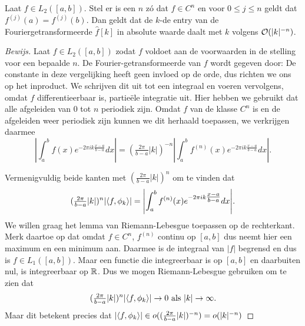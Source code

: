 \begin{stelling}
\label{fourier_daling}
  Laat $f \in L_2([a,b])$. Stel er is een $n$ z\'o dat $f \in C^n$ en voor $0\leq j\leq n$ geldt dat $f^{(j)}(a) = f^{(j)}(b)$. Dan geldt dat de $k$-de entry van de Fouriergetransformeerde $\hat f[k]$ in absolute waarde
  daalt met $k$ volgens $\mathcal{O}(|k|^{-n})$.
\end{stelling}
\begin{proof}[Bewijs]
  Laat $f \in L_2([a,b])$ zodat $f$ voldoet aan de voorwaarden in de stelling voor een bepaalde $n$. 
  De Fourier-getransformeerde van $f$ wordt gegeven door:
  De constante in deze vergelijking heeft geen invloed op de orde, dus richten we ons op het inproduct. 
  We schrijven dit uit tot een integraal en voeren vervolgens, omdat $f$ differentieerbaar is, partie\"ele
  integratie uit.
  Hier hebben we gebruikt dat alle afgeleiden van $0$ tot $n$ periodiek zijn.
  Omdat $f$ van de klasse $C^n$ is en de afgeleiden weer periodiek zijn kunnen we dit herhaald toepassen,
  we verkrijgen daarmee
  \[
  \left| \int_a^b f(x) e^{-2 \pi i k \tfrac{x-a}{b-a}} dx \right| 
  = (\tfrac{2 \pi}{b-a} |k|)^{-n}\left| \int_a^b f^{(n)}(x) e^{- 2 \pi i k \tfrac{x-a}{b-a}} dx \right|.
  \]
  
  Vermenigvuldig beide kanten met $(\tfrac{2 \pi}{b-a} |k|)^n$ om te vinden dat
  \[
  (\tfrac{2 \pi}{b-a} |k|)^n {\left| \langle f , \phi_k \rangle \right|} 
  = {\left| \int_a^b f^{(n)}(x) e^{- 2 \pi i k \tfrac{x-a}{b-a}} dx \right|}.
  \]
  We willen graag het lemma van Riemann-Lebesgue toepassen op de rechterkant. 
  Merk daartoe op dat omdat $f \in C^n$, $f^{(n)}$ continu op $[a,b]$ 
  dus neemt hier een maximum en een minimum aan. 
  Daarmee is de integraal van $|f|$ begrensd en dus is $f\in L_1([a,b])$. 
  Maar een functie die integreerbaar is op $[a,b]$ en daarbuiten nul, is integreerbaar op $\mathbb{R}$. 
  Dus we mogen Riemann-Lebesgue gebruiken om te zien dat
  \[
  (\tfrac{2 \pi}{b-a} |k|)^n {\left| \langle f , \phi_k \rangle \right|} \to 0 \text{ als } |k| \to \infty.
  \]
  Maar dit betekent precies dat ${\left| \langle f , \phi_k \rangle \right|} \in  o((\tfrac{2 \pi}{b-a} |k|)^{-n}) = o(|k|^{-n})$
\end{proof}

